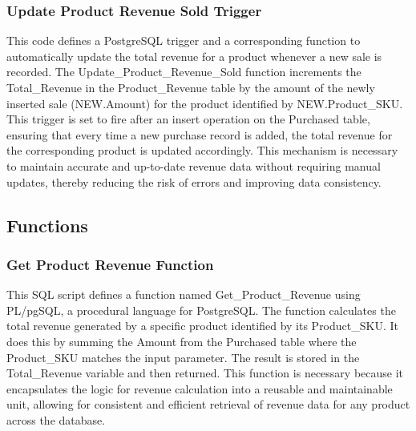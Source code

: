 \subsubsection{Update Product Revenue Sold Trigger}



This code defines a PostgreSQL trigger and a corresponding function to automatically update the total revenue for a product whenever a new sale is recorded. The Update\_Product\_Revenue\_Sold function increments the Total\_Revenue in the Product\_Revenue table by the amount of the newly inserted sale (NEW.Amount) for the product identified by NEW.Product\_SKU. This trigger is set to fire after an insert operation on the Purchased table, ensuring that every time a new purchase record is added, the total revenue for the corresponding product is updated accordingly. This mechanism is necessary to maintain accurate and up-to-date revenue data without requiring manual updates, thereby reducing the risk of errors and improving data consistency.

\subsection{Functions}

\subsubsection{Get Product Revenue Function}



This SQL script defines a function named Get\_Product\_Revenue using PL/pgSQL, a procedural language for PostgreSQL. The function calculates the total revenue generated by a specific product identified by its Product\_SKU. It does this by summing the Amount from the Purchased table where the Product\_SKU matches the input parameter. The result is stored in the Total\_Revenue variable and then returned. This function is necessary because it encapsulates the logic for revenue calculation into a reusable and maintainable unit, allowing for consistent and efficient retrieval of revenue data for any product across the database.

